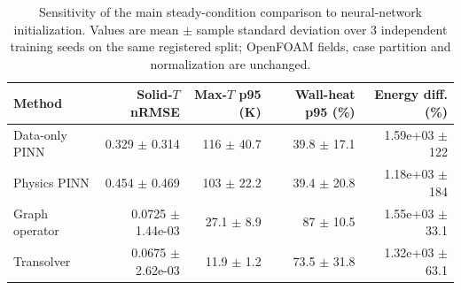 \begin{table}[htbp]
\centering
\scriptsize
\setlength{\tabcolsep}{4.0pt}
\caption{Sensitivity of the main steady-condition comparison to neural-network initialization. Values are mean $\pm$ sample standard deviation over 3 independent training seeds on the same registered split; OpenFOAM fields, case partition and normalization are unchanged.}
\label{tab:steady_seed_robustness}
\begin{tabular}{lrrrr}
\toprule
Method & Solid-$T$ nRMSE & Max-$T$ p95 (K) & Wall-heat p95 (\%) & Energy diff. (\%) \\
\midrule
Data-only PINN & 0.329 $\pm$ 0.314 & 116 $\pm$ 40.7 & 39.8 $\pm$ 17.1 & 1.59e+03 $\pm$ 122 \\
Physics PINN & 0.454 $\pm$ 0.469 & 103 $\pm$ 22.2 & 39.4 $\pm$ 20.8 & 1.18e+03 $\pm$ 184 \\
Graph operator & 0.0725 $\pm$ 1.44e-03 & 27.1 $\pm$ 8.9 & 87 $\pm$ 10.5 & 1.55e+03 $\pm$ 33.1 \\
Transolver & 0.0675 $\pm$ 2.62e-03 & 11.9 $\pm$ 1.2 & 73.5 $\pm$ 31.8 & 1.32e+03 $\pm$ 63.1 \\
\bottomrule
\end{tabular}
\end{table}
